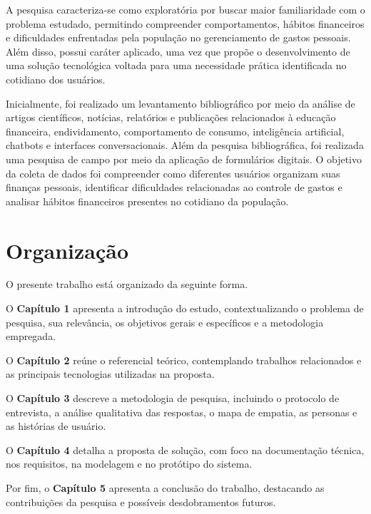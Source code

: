 A pesquisa caracteriza-se como exploratória por buscar maior familiaridade com o problema estudado, permitindo compreender comportamentos, hábitos financeiros e dificuldades enfrentadas pela população no gerenciamento de gastos pessoais. Além disso, possui caráter aplicado, uma vez que propõe o desenvolvimento de uma solução tecnológica voltada para uma necessidade prática identificada no cotidiano dos usuários.

Inicialmente, foi realizado um levantamento bibliográfico por meio da análise de artigos científicos, notícias, relatórios e publicações relacionados à educação financeira, endividamento, comportamento de consumo, inteligência artificial, chatbots e interfaces conversacionais. Além da pesquisa bibliográfica, foi realizada uma pesquisa de campo por meio da aplicação de formulários digitais. O objetivo da coleta de dados foi compreender como diferentes usuários organizam suas finanças pessoais, identificar dificuldades relacionadas ao controle de gastos e analisar hábitos financeiros presentes no cotidiano da população.

\section{Organização}

O presente trabalho está organizado da seguinte forma.

O \textbf{Capítulo 1} apresenta a introdução do estudo, contextualizando o problema de pesquisa, sua relevância, os objetivos gerais e específicos e a metodologia empregada.

O \textbf{Capítulo 2} reúne o referencial teórico, contemplando trabalhos relacionados e as principais tecnologias utilizadas na proposta.

O \textbf{Capítulo 3} descreve a metodologia de pesquisa, incluindo o protocolo de entrevista, a análise qualitativa das respostas, o mapa de empatia, as personas e as histórias de usuário.

O \textbf{Capítulo 4} detalha a proposta de solução, com foco na documentação técnica, nos requisitos, na modelagem e no protótipo do sistema.

Por fim, o \textbf{Capítulo 5} apresenta a conclusão do trabalho, destacando as contribuições da pesquisa e possíveis desdobramentos futuros.
